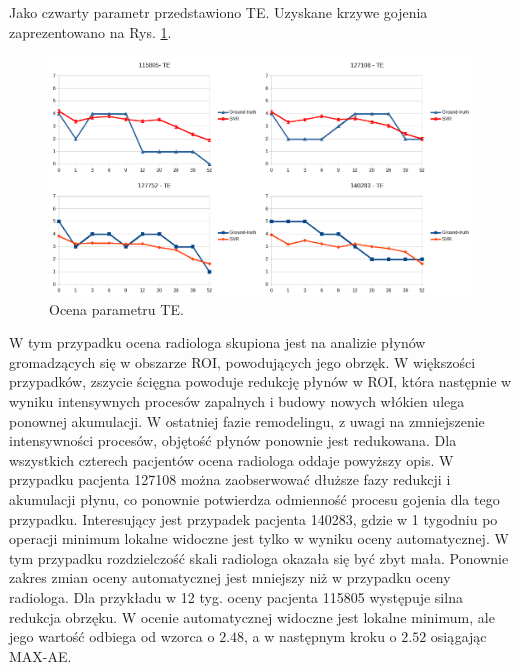 Jako czwarty parametr przedstawiono TE. Uzyskane krzywe gojenia zaprezentowano na Rys. \ref{fig:TE}.
\begin{figure}[h!]
	\centering
	\includegraphics[width=1\textwidth]{figures/TE.png}
	\caption{Ocena parametru TE.}\label{fig:TE}
\end{figure}
W tym przypadku ocena radiologa skupiona jest na analizie płynów gromadzących się w obszarze ROI, powodujących jego obrzęk. W większości przypadków, zszycie ścięgna powoduje redukcję płynów w ROI, która następnie w wyniku intensywnych procesów zapalnych i budowy nowych włókien ulega ponownej akumulacji. W ostatniej fazie remodelingu, z uwagi na zmniejszenie intensywności procesów, objętość płynów ponownie jest redukowana. Dla wszystkich czterech pacjentów ocena radiologa oddaje powyższy opis. W przypadku pacjenta 127108 można zaobserwować dłuższe fazy redukcji i akumulacji płynu, co ponownie potwierdza odmienność procesu gojenia dla tego przypadku. Interesujący jest przypadek pacjenta 140283, gdzie w 1 tygodniu po operacji minimum lokalne widoczne jest tylko w wyniku oceny automatycznej. W tym przypadku rozdzielczość skali radiologa okazała się być zbyt mała. Ponownie zakres zmian oceny automatycznej jest mniejszy niż w przypadku oceny radiologa. Dla przykładu w 12 tyg. oceny pacjenta 115805 występuje silna redukcja obrzęku. W ocenie automatycznej widoczne jest lokalne minimum, ale jego wartość odbiega od wzorca o $2.48$, a w następnym kroku o $2.52$ osiągając MAX-AE.

